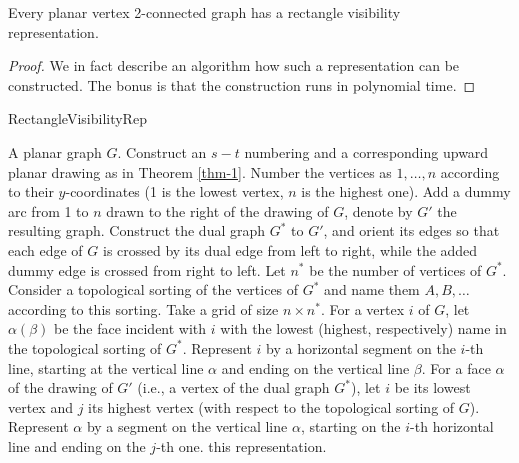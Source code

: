 \begin{thm}
	Every planar vertex 2-connected graph has a rectangle visibility \\ representation.
\end{thm}

\begin{proof}
	We in fact describe an algorithm how such a representation can be constructed. The bonus is that the construction runs in polynomial time.
\end{proof}

\begin{algorithm}[!ht]
	\caption{RectangleVisibilityRep}
	\begin{algorithmic}[1]
		\Require A planar graph $G$.
		\State Construct an $s - t$ numbering and a corresponding upward planar drawing as in Theorem \ref{thm-1}.
		\State Number the vertices as $1, \dots, n$ according to their $y$-coordinates (1 is the lowest vertex, $n$ is the highest one).
		\State Add a dummy arc from 1 to $n$ drawn to the right of the drawing of $G$, denote by $G'$ the resulting graph.
		\State Construct the dual graph $G^\ast$ to $G'$, and orient its edges so that each edge of $G$ is crossed by its dual edge from left to right, while the added dummy edge is crossed from right to left. Let $n^\ast$ be the number of vertices of $G^\ast$.
		\State Consider a topological sorting of the vertices of $G^\ast$ and name them $A, B, \dots$ according to this sorting.
		\State Take a grid of size $n \times n^\ast$. For a vertex $i$ of $G$, let $\alpha(\beta)$ be the face incident with $i$ with the lowest (highest, respectively) name in the topological sorting of $G^\ast$. Represent $i$ by a horizontal segment on the $i$-th line, starting at the vertical line $\alpha$ and ending on the vertical line $\beta$. For a face $\alpha$ of the drawing of $G'$ (i.e., a vertex of the dual graph $G^\ast$), let $i$ be its lowest vertex and $j$ its highest vertex (with respect to the topological sorting of $G$). Represent $\alpha$ by a segment on the vertical line $\alpha$, starting on the $i$-th horizontal line and ending on the $j$-th one.
		\State \Return this representation.
	\end{algorithmic}
\end{algorithm}

